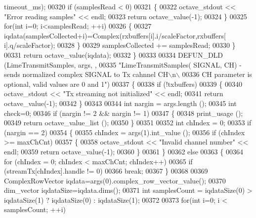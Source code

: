 \begin{DoxyCode}
      timeout\_ms);
00320         \textcolor{keywordflow}{if} (samplesRead < 0)
00321         \{
00322             octave\_stdout << \textcolor{stringliteral}{"Error reading samples"} << endl;
00323             \textcolor{keywordflow}{return} octave\_value(-1);
00324         \}
00325         \textcolor{keywordflow}{for}(\textcolor{keywordtype}{int} i=0; i<samplesRead; ++i)
00326         \{
00327             iqdata(samplesCollected+i)=Complex(rxbuffers[i].i/scaleFactor,rxbuffers[
      i].q/scaleFactor);
00328         \}
00329         samplesCollected += samplesRead;
00330     \}
00331     \textcolor{keywordflow}{return} octave\_value(iqdata);
00332 \}
00333 
00334 DEFUN_DLD (LimeTransmitSamples, args, ,
00335 \textcolor{stringliteral}{"LimeTransmitSamples( SIGNAL, CH) - sends normalized complex SIGNAL to Tx cahnnel CH\(\backslash\)n\(\backslash\)}
00336 \textcolor{stringliteral}{CH parameter is optional, valid values are 0 and 1"})
00337 \{
00338     \textcolor{keywordflow}{if} (!txbuffers)
00339     \{
00340         octave\_stdout << \textcolor{stringliteral}{"Tx streaming not initialized"} << endl;
00341         \textcolor{keywordflow}{return} octave\_value(-1);
00342     \}
00343 
00344     \textcolor{keywordtype}{int} nargin = args.length ();
00345     \textcolor{keywordtype}{int} check=0;
00346     \textcolor{keywordflow}{if} (nargin != 2 && nargin != 1)
00347     \{
00348         print\_usage ();
00349         \textcolor{keywordflow}{return} octave\_value\_list ();
00350     \}
00351 
00352     \textcolor{keywordtype}{int} chIndex = 0;
00353     \textcolor{keywordflow}{if} (nargin == 2)
00354     \{
00355         chIndex = args(1).int\_value ();
00356         \textcolor{keywordflow}{if} (chIndex >= maxChCnt)
00357         \{
00358             octave\_stdout << \textcolor{stringliteral}{"Invalid channel number"} << endl;
00359             \textcolor{keywordflow}{return} octave\_value(-1);
00360         \}
00361     \}
00362     \textcolor{keywordflow}{else}
00363     \{
00364         \textcolor{keywordflow}{for} (chIndex = 0; chIndex < maxChCnt; chIndex++)
00365             \textcolor{keywordflow}{if} (streamTx[chIndex].handle != 0)
00366                 \textcolor{keywordflow}{break};
00367     \}
00368 
00369     ComplexRowVector    iqdata=args(0).complex\_row\_vector\_value();
00370     dim\_vector          iqdataSize=iqdata.dims();
00371     \textcolor{keywordtype}{int} samplesCount = iqdataSize(0) > iqdataSize(1) ? iqdataSize(0) : iqdataSize(1);
00372 
00373     \textcolor{keywordflow}{for}(\textcolor{keywordtype}{int} i=0; i < samplesCount; ++i)

\end{DoxyCode}
